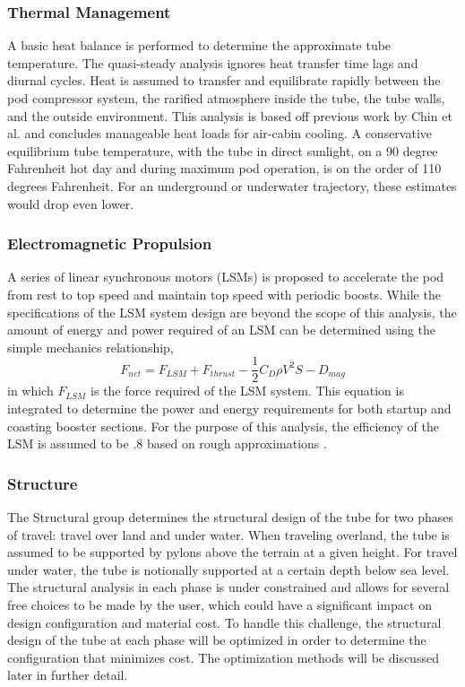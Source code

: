 \subsubsection{Thermal Management}
	A basic heat balance is performed to determine the approximate tube
	temperature. The quasi-steady analysis ignores heat transfer time lags and
	diurnal cycles. Heat is assumed to transfer and equilibrate rapidly
	between the pod compressor system, the rarified atmosphere inside the
	tube, the tube walls, and the outside environment. This analysis is
	based off previous work by Chin et al.\cite{Chin} and concludes manageable heat
	loads for air-cabin cooling. A conservative equilibrium tube temperature,
	with the tube in direct sunlight, on a 90 degree Fahrenheit hot day and
	during maximum pod operation, is on the order of 110 degrees Fahrenheit.
	For an underground or underwater trajectory, these estimates would drop even lower.
\subsubsection{Electromagnetic Propulsion}
	A series of linear synchronous motors (LSMs) is proposed to accelerate the
	pod from rest to top speed and maintain top speed with periodic boosts.
	While the specifications of the LSM system design are beyond the scope of
	this analysis, the amount of energy and power required of an LSM can be
	determined using the simple mechanics relationship,
	\begin{equation}
		\label{eq:sum_of_forces}
		F_{net} = F_{LSM} + F_{thrust} - \frac{1}{2}C_{D}\rho V^{2}S - D_{mag}
	\end{equation}
	in which $F_{LSM}$ is the force required of the LSM system. This equation
	is integrated to determine the power and energy requirements for both
	startup and coasting booster sections. For the purpose of this analysis,
	the efficiency of the LSM is assumed to be .8 based on rough approximations \cite{LSM}.
\subsubsection{Structure}
	The Structural group determines the structural design of the tube
	for two phases of travel: travel over land and under water. When traveling
	overland, the tube is assumed to be supported by pylons above the terrain
	at a given height. For travel under water, the tube is notionally
	supported at a certain depth below sea level. The structural analysis in
	each phase is under constrained and allows for several free choices to be
	made by the user, which could have a significant impact on design
	configuration and material cost. To handle this challenge, the structural
	design of the tube at each phase will be optimized in order to determine
	the configuration that minimizes cost. The optimization methods will be
	discussed later in further detail.

